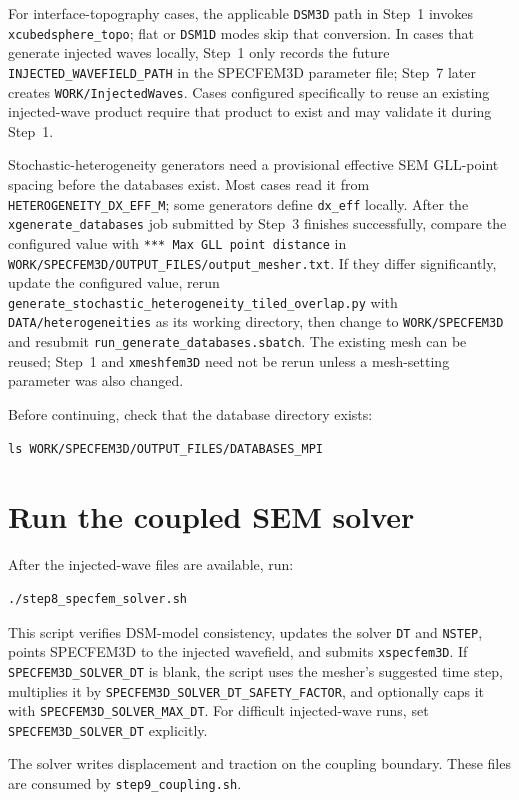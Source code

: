 \documentclass[11pt,oneside]{book}
\newcommand{\specfem}{SPECFEM3D}
\DeclareRobustCommand{\code}[1]{\nolinkurl{#1}}
\begin{document}
For interface-topography cases, the applicable \code{DSM3D} path in Step~1
invokes \code{xcubedsphere_topo}; flat or \code{DSM1D} modes skip that
conversion. In cases that generate injected waves locally, Step~1 only records
the future \code{INJECTED_WAVEFIELD_PATH} in the SPECFEM3D parameter file;
Step~7 later creates \code{WORK/InjectedWaves}. Cases configured specifically
to reuse an existing injected-wave product require that product to exist and
may validate it during Step~1.

Stochastic-heterogeneity generators need a provisional effective SEM
GLL-point spacing before the databases exist. Most cases read it from
\code{HETEROGENEITY_DX_EFF_M}; some generators define \code{dx_eff} locally.
After the \code{xgenerate_databases} job submitted by Step~3 finishes
successfully, compare the configured value with
\code{*** Max GLL point distance} in
\code{WORK/SPECFEM3D/OUTPUT_FILES/output_mesher.txt}. If they differ
significantly, update the configured value, rerun
\code{generate_stochastic_heterogeneity_tiled_overlap.py} with
\code{DATA/heterogeneities} as its working directory, then change to
\code{WORK/SPECFEM3D} and resubmit
\code{run_generate_databases.sbatch}. The existing mesh can be reused; Step~1
and \code{xmeshfem3D} need not be rerun unless a mesh-setting parameter was
also changed.

Before continuing, check that the database directory exists:
\begin{lstlisting}
ls WORK/SPECFEM3D/OUTPUT_FILES/DATABASES_MPI
\end{lstlisting}

\section{Run the coupled SEM solver}

After the injected-wave files are available, run:
\begin{lstlisting}
./step8_specfem_solver.sh
\end{lstlisting}
This script verifies DSM-model consistency, updates the solver \code{DT} and
\code{NSTEP}, points \specfem{} to the injected wavefield, and submits
\code{xspecfem3D}. If \code{SPECFEM3D_SOLVER_DT} is blank, the script uses the
mesher's suggested time step, multiplies it by
\code{SPECFEM3D_SOLVER_DT_SAFETY_FACTOR}, and optionally caps it with
\code{SPECFEM3D_SOLVER_MAX_DT}. For difficult injected-wave runs, set
\code{SPECFEM3D_SOLVER_DT} explicitly.

The solver writes displacement and traction on the coupling boundary. These
files are consumed by \code{step9_coupling.sh}.
\end{document}
